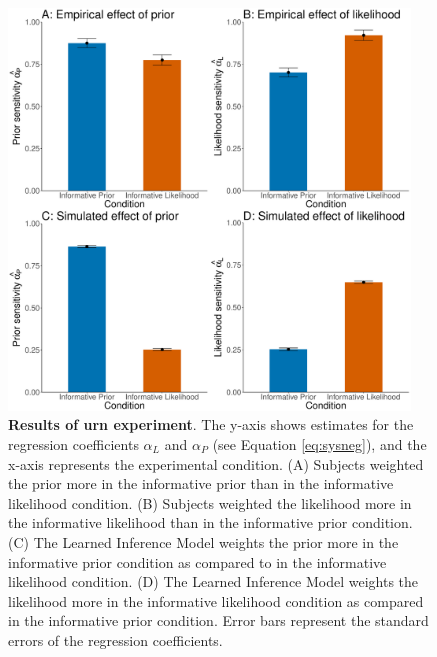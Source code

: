 \begin{figure}
\includegraphics[width=0.95\textwidth]{figures/resulturns.pdf}
\caption{\textbf{Results of urn experiment}. The y-axis shows estimates for the regression coefficients $\alpha_L$ and $\alpha_P$ (see Equation \ref{eq:sysneg}), and the x-axis represents the experimental condition. (A) Subjects weighted the prior more in the informative prior than in the informative likelihood condition. (B) Subjects weighted the likelihood more in the informative likelihood than in the informative prior condition. (C) The Learned Inference Model weights the prior more in the informative prior condition as compared to in the informative likelihood condition. (D) The Learned Inference Model weights the likelihood more in the informative likelihood condition as compared in the informative prior condition. Error bars represent the standard errors of the regression coefficients.}
\label{fig:urnresults}
\end{figure}

